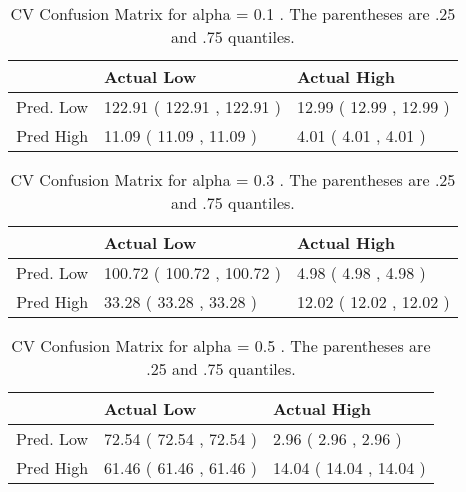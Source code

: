 \begin{table}[H]
\begin{center}
\begin{tabular}{rll}
  \hline
 & Actual Low & Actual High \\ 
  \hline
Pred. Low & 122.91 ( 122.91 , 122.91 ) & 12.99 ( 12.99 , 12.99 ) \\ 
  Pred High & 11.09 ( 11.09 , 11.09 ) & 4.01 ( 4.01 , 4.01 ) \\ 
   \hline
\end{tabular}
\caption{CV Confusion Matrix for alpha = 0.1 . The parentheses are .25 and .75 quantiles.}
\end{center}
\end{table}
\begin{table}[H]
\begin{center}
\begin{tabular}{rll}
  \hline
 & Actual Low & Actual High \\ 
  \hline
Pred. Low & 100.72 ( 100.72 , 100.72 ) & 4.98 ( 4.98 , 4.98 ) \\ 
  Pred High & 33.28 ( 33.28 , 33.28 ) & 12.02 ( 12.02 , 12.02 ) \\ 
   \hline
\end{tabular}
\caption{CV Confusion Matrix for alpha = 0.3 . The parentheses are .25 and .75 quantiles.}
\end{center}
\end{table}
\begin{table}[H]
\begin{center}
\begin{tabular}{rll}
  \hline
 & Actual Low & Actual High \\ 
  \hline
Pred. Low & 72.54 ( 72.54 , 72.54 ) & 2.96 ( 2.96 , 2.96 ) \\ 
  Pred High & 61.46 ( 61.46 , 61.46 ) & 14.04 ( 14.04 , 14.04 ) \\ 
   \hline
\end{tabular}
\caption{CV Confusion Matrix for alpha = 0.5 . The parentheses are .25 and .75 quantiles.}
\end{center}
\end{table}
